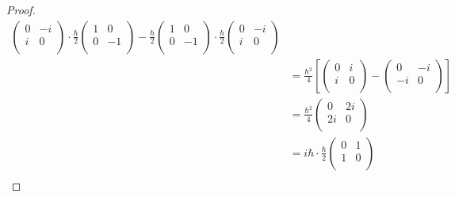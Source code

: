 \documentclass[../psets.tex]{subfiles}
\begin{document}
\begin{enumerate}
\begin{enumerate}
\begin{proof}
\begin{align*}
\begin{pmatrix}
                    0 & -i\\
                    i & 0\\
                \end{pmatrix}
                \cdot\frac{\hbar}{2}
                \begin{pmatrix}
                    1 & 0\\
                    0 & -1\\
                \end{pmatrix}
                -\frac{\hbar}{2}
                \begin{pmatrix}
                    1 & 0\\
                    0 & -1\\
                \end{pmatrix}
                \cdot\frac{\hbar}{2}
                \begin{pmatrix}
                    0 & -i\\
                    i & 0\\
                \end{pmatrix}\\
                &= \frac{\hbar^2}{4}\left[
                    \begin{pmatrix}
                        0 & i\\
                        i & 0\\
                    \end{pmatrix}
                    -
                    \begin{pmatrix}
                        0 & -i\\
                        -i & 0\\
                    \end{pmatrix}
                \right]\\
                &= \frac{\hbar^2}{4}
                \begin{pmatrix}
                    0 & 2i\\
                    2i & 0\\
                \end{pmatrix}\\
                &= i\hbar\cdot\frac{\hbar}{2}
                \begin{pmatrix}
                    0 & 1\\
                    1 & 0\\
                \end{pmatrix}\\

\end{align*}
\end{proof}
\end{enumerate}
\end{enumerate}
\end{document}
